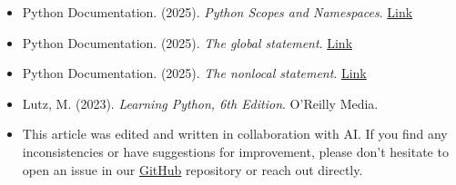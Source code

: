 \begin{itemize}
    \item Python Documentation. (2025). \textit{Python Scopes and Namespaces}.
    \href{https://docs.python.org/3/tutorial/classes.html#python-scopes-and-namespaces}{Link}
    
    \item Python Documentation. (2025). \textit{The global statement}. 
    \href{https://docs.python.org/3/reference/simple_stmts.html#the-global-statement}{Link}
    
    \item Python Documentation. (2025). \textit{The nonlocal statement}. 
    \href{https://docs.python.org/3/reference/simple_stmts.html#the-nonlocal-statement}{Link}
    
    \item Lutz, M. (2023). \textit{Learning Python, 6th Edition}. O'Reilly Media.
    
    \item This article was edited and written in collaboration with AI. If you find any inconsistencies or have suggestions for improvement, please don't hesitate to open an issue in our \href{https://github.com/asanchezyali/social-media-posts}{GitHub} repository or reach out directly.
\end{itemize}


